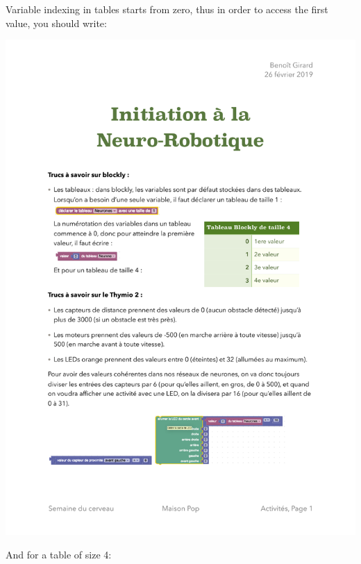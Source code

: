 \documentclass[12pt]{article}
\begin{document}
Variable indexing in tables starts from zero, thus in order to access the first value, you should write:

\includegraphics{../AccesTableau.pdf}

And for a table of size 4:
\end{document}
